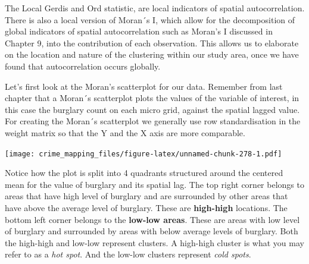 \documentclass[
  krantz2]{krantz}
\makeatletter
\newenvironment{Shaded}{\begin{snugshade}}{\end{snugshade}}
\newcommand{\AttributeTok}[1]{\textcolor[rgb]{0.61,0.61,0.61}{#1}}
\newcommand{\CommentTok}[1]{\textcolor[rgb]{0.37,0.37,0.37}{\textit{#1}}}
\newcommand{\DecValTok}[1]{\textcolor[rgb]{0.06,0.06,0.06}{#1}}
\newcommand{\FunctionTok}[1]{\textcolor[rgb]{0,0,0}{#1}}
\newcommand{\NormalTok}[1]{#1}
\newcommand{\OtherTok}[1]{\textcolor[rgb]{0.37,0.37,0.37}{#1}}
\newcommand{\SpecialCharTok}[1]{\textcolor[rgb]{0,0,0}{#1}}
\newcommand{\StringTok}[1]{\textcolor[rgb]{0.5,0.5,0.5}{#1}}
\newenvironment{kframe}{%
\medskip{}
\setlength{\fboxsep}{.8em}
 \def\at@end@of@kframe{}%
 \ifinner\ifhmode%
  \def\at@end@of@kframe{\end{minipage}}%
  \begin{minipage}{\columnwidth}%
 \fi\fi%
 \def\FrameCommand##1{\hskip\@totalleftmargin \hskip-\fboxsep
 \colorbox{shadecolor}{##1}\hskip-\fboxsep
     \hskip-\linewidth \hskip-\@totalleftmargin \hskip\columnwidth}%
 \MakeFramed {\advance\hsize-\width
   \@totalleftmargin\z@ \linewidth\hsize
   \@setminipage}}%
 {\par\unskip\endMakeFramed%
 \at@end@of@kframe}
\renewenvironment{Shaded}{\begin{kframe}}{\end{kframe}}
\makeatother
\begin{document}
The Local Gerdis and Ord statistic, are local indicators of spatial autocorrelation. There is also a local version of Moran´s I, which allow for the decomposition of global indicators of spatial autocorrelation such as Moran's I discussed in Chapter 9, into the contribution of each observation. This allows us to elaborate on the location and nature of the clustering within our study area, once we have found that autocorrelation occurs globally.

Let's first look at the Moran's scatterplot for our data. Remember from last chapter that a Moran´s scatterplot plots the values of the variable of interest, in this case the burglary count on each micro grid, against the spatial lagged value. For creating the Moran´s scatterplot we generally use row standardisation in the weight matrix so that the Y and the X axis are more comparable.

\begin{Shaded}
\end{Shaded}

\texttt{[image: crime\_mapping\_files/figure-latex/unnamed-chunk-278-1.pdf]}

Notice how the plot is split into 4 quadrants structured around the centered mean for the value of burglary and its spatial lag. The top right corner belongs to areas that have high level of burglary and are surrounded by other areas that have above the average level of burglary. These are \textbf{high-high} locations. The bottom left corner belongs to the \textbf{low-low areas}. These are areas with low level of burglary and surrounded by areas with below average levels of burglary. Both the high-high and low-low represent clusters. A high-high cluster is what you may refer to as a \emph{hot spot}. And the low-low clusters represent \emph{cold spots}.
\end{document}
